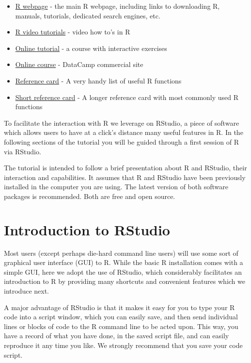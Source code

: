 \documentclass[]{book}
\providecommand{\tightlist}{%
  \setlength{\itemsep}{0pt}\setlength{\parskip}{0pt}}
\theoremstyle{definition}
\theoremstyle{definition}
\theoremstyle{remark}
\begin{document}
\begin{itemize}
\tightlist
\item
  \href{http://www.r-project.org}{R webpage} - the main R webpage,
  including links to downloading R, manuals, tutorials, dedicated search
  engines, etc.
\item
  \href{http://blog.revolutionanalytics.com/2013/08/google-video-r-tutorials.html}{R
  video tutorials} - video how to's in R
\item
  \href{http://www.datamind.org/}{Online tutorial} - a course with
  interactive exercises
\item
  \href{https://www.datacamp.com/getting-started?step=2\&track=r}{Online
  course} - DataCamp commercial site
\item
  \href{http://cran.r-project.org/doc/contrib/refcard.pdf}{Reference
  card} - A very handy list of useful R functions
\item
  \href{http://cran.r-project.org/doc/contrib/Short-refcard.pdf}{Short
  reference card} - A longer reference card with most commonly used R
  functions
\end{itemize}

To facilitate the interaction with R we leverage on RStudio, a piece of
software which allows users to have at a click's distance many useful
features in R. In the following sections of the tutorial you will be
guided through a first session of R via RStudio.

The tutorial is intended to follow a brief presentation about R and
RStudio, their interaction and capabilities. It assumes that R and
RStudio have been previously installed in the computer you are using.
The latest version of both software packages is recommended. Both are
free and open source.

\section{Introduction to RStudio}\label{introduction-to-rstudio}

Most users (except perhaps die-hard command line users) will use some
sort of graphical user interface (GUI) to R. While the basic R
installation comes with a simple GUI, here we adopt the use of RStudio,
which considerably facilitates an introduction to R by providing many
shortcuts and convenient features which we introduce next.

A major advantage of RStudio is that it makes it easy for you to type
your R code into a script window, which you can easily save, and then
send individual lines or blocks of code to the R command line to be
acted upon. This way, you have a record of what you have done, in the
saved script file, and can easily reproduce it any time you like. We
strongly recommend that you save your code script.
\end{document}
